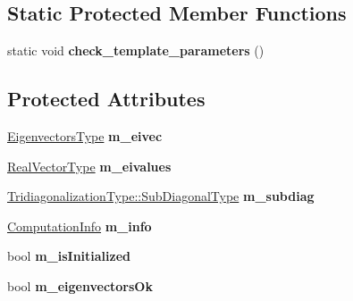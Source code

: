 \subsection*{Static Protected Member Functions}
\begin{DoxyCompactItemize}
\item 
\mbox{\label{class_eigen_1_1_self_adjoint_eigen_solver_a8992bfdbf1c6dbdd44dc8c4cfa1467a6}} 
static void {\bfseries check\+\_\+template\+\_\+parameters} ()
\end{DoxyCompactItemize}
\subsection*{Protected Attributes}
\begin{DoxyCompactItemize}
\item 
\mbox{\label{class_eigen_1_1_self_adjoint_eigen_solver_a4c86f72288084ac48c2b6493a893bae4}} 
\mbox{\hyperlink{class_eigen_1_1_matrix}{Eigenvectors\+Type}} {\bfseries m\+\_\+eivec}
\item 
\mbox{\label{class_eigen_1_1_self_adjoint_eigen_solver_a1ba3c7fe4703ee7eed528a18e53b0289}} 
\mbox{\hyperlink{class_eigen_1_1_self_adjoint_eigen_solver_acd090d5fdfc3cc017a13b6d8daa92287}{Real\+Vector\+Type}} {\bfseries m\+\_\+eivalues}
\item 
\mbox{\label{class_eigen_1_1_self_adjoint_eigen_solver_a5da95aa467ce0555d01a69ba357f62bb}} 
\mbox{\hyperlink{class_eigen_1_1_matrix}{Tridiagonalization\+Type\+::\+Sub\+Diagonal\+Type}} {\bfseries m\+\_\+subdiag}
\item 
\mbox{\label{class_eigen_1_1_self_adjoint_eigen_solver_a7d3a941711a788da32be6cc6126e698b}} 
\mbox{\hyperlink{group__enums_ga85fad7b87587764e5cf6b513a9e0ee5e}{Computation\+Info}} {\bfseries m\+\_\+info}
\item 
\mbox{\label{class_eigen_1_1_self_adjoint_eigen_solver_a7619df2065e46bde1f509cae1bc15a97}} 
bool {\bfseries m\+\_\+is\+Initialized}
\item 
\mbox{\label{class_eigen_1_1_self_adjoint_eigen_solver_a26697e6c17e490fd4f6315276c597fb1}} 
bool {\bfseries m\+\_\+eigenvectors\+Ok}
\end{DoxyCompactItemize}

